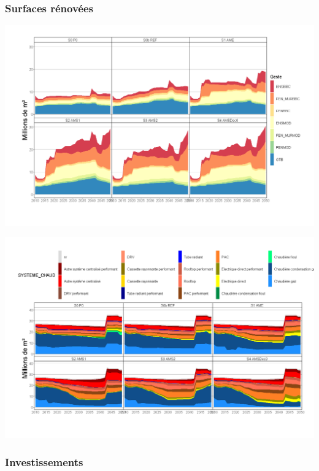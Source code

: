 \documentclass[]{article}
\begin{document}
\clearpage
\newpage

\subsubsection{Surfaces rénovées}\label{surfaces-renovees}

\includegraphics{Exemple_sortiestertiaire_files/figure-latex/Surfaces_Renov_geste-1.png}

\includegraphics{Exemple_sortiestertiaire_files/figure-latex/Surfaces_Renov_syst-1.png}

\clearpage
\newpage

\subsubsection{Investissements}\label{investissements}
\end{document}
